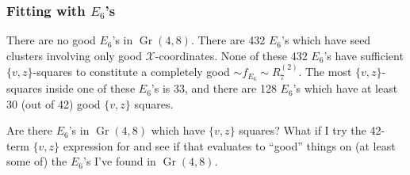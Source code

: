 \documentclass[12pt]{article}
\DeclareMathOperator{\Gr}{Gr}
\begin{document}
\subsubsection*{Fitting with $E_6$'s}

There are no good $E_6$'s in $\Gr(4,8)$. There are 432 $E_6$'s which have seed clusters involving only good $\mathcal{X}$-coordinates. None of these 432 $E_6$'s have sufficient $\{v,z\}$-squares to constitute a completely good $\sim f_{E_6} \sim R^{(2)}_7$. The most $\{v,z\}$-squares inside one of these $E_6$'s is 33, and there are 128 $E_6$'s which have at least 30 (out of 42) good $\{v,z\}$ squares. 

Are there $E_6$'s in $\Gr(4,8)$ which have $\{v,z\}$ squares? What if I try the 42-term $\{v,z\}$ expression for  and see if that evaluates to ``good'' things on (at least some of) the $E_6$'s I've found in $\Gr(4,8)$.
\end{document}
